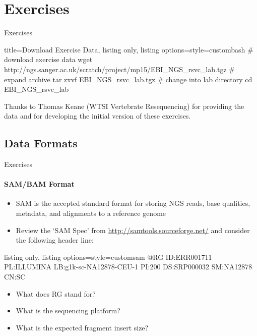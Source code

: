 \documentclass{beamer}
\begin{document}
\section{Exercises}

\begin{frame}[fragile]{Exercises}
\begin{tcblisting}{title={Download Exercise Data}, listing only, listing options={style=custombash}}
# download exercise data
wget http://ngs.sanger.ac.uk/scratch/project/mp15/EBI_NGS_rsvc_lab.tgz
# expand archive
tar zxvf EBI_NGS_rsvc_lab.tgz
# change into lab directory
cd EBI_NGS_rsvc_lab
\end{tcblisting}
\footnotesize{Thanks to Thomas Keane (WTSI Vertebrate Resequencing) for providing the data and for developing the initial version of these exercises. }
\end{frame}



\subsection{Data Formats}
\begin{frame}[fragile]{Exercises}
\framesubtitle{SAM/BAM Format}
\begin{itemize}
\item SAM is the accepted standard format for storing NGS reads, base qualities, metadata, and alignments to a reference genome
\item Review the `SAM Spec' from \url{http://samtools.sourceforge.net/} and consider the following header line: 
\end{itemize}
\begin{tcblisting}{listing only, listing options={style=customsam}}
@RG	ID:ERR001711	PL:ILLUMINA	LB:g1k-sc-NA12878-CEU-1	PI:200	DS:SRP000032	SM:NA12878	CN:SC
\end{tcblisting}
\begin{itemize}
\item What does RG stand for?
\item What is the sequencing platform?
\item What is the expected fragment insert size?
\end{itemize}
\end{frame}
\end{document}
